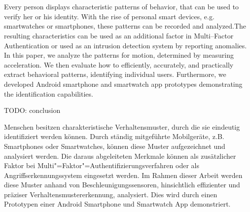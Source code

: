 \chapter{\abstractname}
Every person displays characteristic patterns of behavior, that can be used to verify her or his identity. With the rise of personal smart devices, e.g. smartwatches or smartphones, these patterns can be recorded and analyzed.The resulting characteristics can be used as an additional factor in Multi--Factor Authentication or used as an intrusion detection system by reporting anomalies.
In this paper, we analyze the patterns for motion, determined by measuring acceleration. We then evaluate how to efficiently, accurately, and practically extract behavioral patterns, identifying individual users. Furthermore, we developed Android smartphone and smartwatch app prototypes demonstrating the identification capabilities.

TODO: conclusion

\vspace{3cm}
Menschen besitzen charakteristische Verhaltensmuster, durch die sie eindeutig identifiziert werden können. Durch ständig mitgeführte Mobilgeräte, z.B. Smartphones oder Smartwatches, können diese Muster aufgezeichnet und analysiert werden. Die daraus abgeleiteten Merkmale können als zusätzlicher Faktor bei Multi"=Faktor"=Authentifizierungsverfahren oder als Angriffserkennungssystem eingesetzt werden.
Im Rahmen dieser Arbeit werden diese Muster anhand von Beschleunigungssensoren, hinsichtlich effizienter und präziser Verhaltensmustererkennung, analysiert. Dies wird durch einen Prototypen einer Android Smartphone und Smartwatch App demonstriert.

